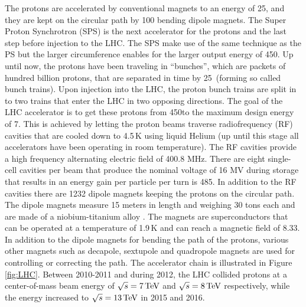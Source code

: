 The protons are accelerated by conventional magnets to an energy of 25\GeV, and they are kept on the circular path by 100 bending dipole magnets.
The Super Proton Synchrotron (SPS) is the next accelerator for the protons and the last step before injection to the LHC. 
The SPS make use of the same technique as the PS but the larger circumference enables for the larger output energy of 450\GeV.
\newpara
\noindent\justify
Up until now, the protons have been traveling in ``bunches'', which are packets of hundred billion protons, that are separated in time by 25\ns\ (forming so called bunch trains). 
Upon injection into the LHC, the proton bunch trains are split in to two trains that enter the LHC in two opposing directions. 
The goal of the LHC accelerator is to get these protons from 450\GeV to the maximum design energy of 7\TeV. 
This is achieved by letting the proton beams traverse radiofrequency (RF) cavities that are cooled down to 4.5$\,$K using liquid Helium (up until this stage all accelerators have been operating in room temperature). 
The RF cavities provide a high frequency alternating electric field of 400.8 MHz.
There are eight single-cell cavities per beam that produce the nominal voltage of 16 MV during storage that results in an energy gain per particle per turn is 485\keV.   
In addition to the RF cavities there are 1232 dipole magnets keeping the protons on the circular path. 
The dipole magnets measure 15 meters in length and weighing 30 tons each and are made of a niobium-titanium alloy \cite{Boussard:1999rf}. 
The magnets are superconductors that can be operated at a temperature of 1.9$\,$K and can reach a magnetic field of 8.33\T. 
In addition to the dipole magnets for bending the path of the protons, various other magnets such as decapole, sextupole and quadropole magnets are used for controlling or correcting the path.      
The accelerator chain is illustrated in Figure \ref{fig:LHC}. 
Between 2010-2011 and during 2012, the LHC collided protons at a center-of-mass beam energy of $\sqrt{s}=7\,\text{Te\hspace{-.08em}V}$ and $\sqrt{s}=8\,\text{Te\hspace{-.08em}V}$ respectively, while the energy increased to $\sqrt{s}=13\,\text{Te\hspace{-.08em}V}$ in 2015 and 2016. 

